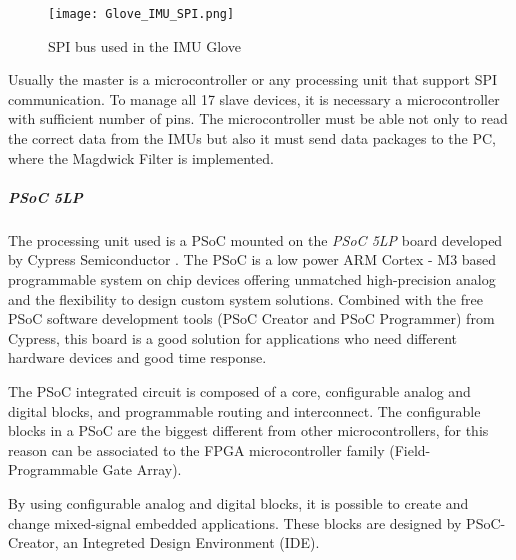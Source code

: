 \begin{figure}[h]
\centering
\texttt{[image: Glove\_IMU\_SPI.png]}
\caption{SPI bus used in the IMU Glove}
\label{fig:IMU_Glove_bus}
\end{figure}

Usually the master is a microcontroller  or any processing unit that support SPI communication. To manage all 17 slave devices,  it is necessary a microcontroller with sufficient number of pins. The microcontroller must be able not only to read the correct data from the IMUs but also it must send  data packages to the PC, where the Magdwick Filter is implemented.   \\
\newline

\subparagraph{PSoC 5LP}

The processing unit used is a PSoC mounted on the \textit{PSoC 5LP} board developed by Cypress Semiconductor \cite{PSOC5LP}. The PSoC is a low power ARM \textsuperscript \textregistered Cortex - M3 based programmable system on chip devices offering unmatched high-precision analog and the flexibility to design custom system solutions. Combined with the free PSoC software development tools (PSoC Creator and
PSoC Programmer) from Cypress, this board is a good solution for applications who need different hardware devices and good time response. %

The PSoC integrated circuit is composed of a core, configurable analog and digital blocks, and programmable routing and interconnect. The configurable blocks in a PSoC are the biggest different from other microcontrollers, for this reason can be associated to the FPGA microcontroller family (Field-Programmable Gate Array). 

By using configurable analog and digital blocks, it is possible to  create and change mixed-signal embedded applications. These blocks are designed by PSoC-Creator, an Integreted Design Environment (IDE).  

